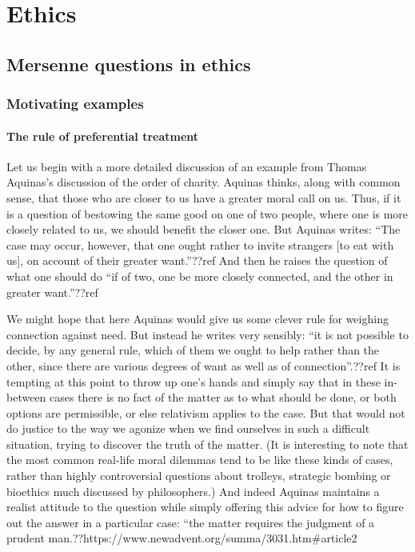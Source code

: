 \def\mychapter{II}

\chapter{Ethics}\label{ch:ethics}
\section{Mersenne questions in ethics}
\subsection{Motivating examples}
\subsubsection{The rule of preferential treatment}
Let us begin with a more detailed discussion of an example from Thomas Aquinas's discussion of the order of charity. Aquinas thinks,
along with common sense, that those who are closer to us have a greater moral call on us.
Thus, if it is a question of bestowing the same good on one of two people, where one is more closely
related to us, we should benefit the closer one. But Aquinas writes: ``The case may occur, however, that one 
ought rather to invite strangers [to eat with us], on 
account of their greater want.''??ref And then he raises the question of what one should do ``if of two, one be 
more closely connected, and the other in greater want.''??ref

We might hope that here Aquinas would give us some clever rule for weighing connection against need. But 
instead he writes very sensibly: ``it is not possible to decide, by any general rule, which of them we ought 
to help rather than the other, since there are various degrees of want as well as of connection''.??ref It is
tempting at this point to throw up one's hands and simply say that in these in-between cases there is no
fact of the matter as to what should be done, or both options are permissible, or else relativism applies
to the case. But that would not do justice to the way we agonize when we find ourselves in such a difficult 
situation, trying to discover the truth of the matter. (It is interesting to note that the most common real-life moral dilemmas
tend to be like these kinds of cases, rather than highly controversial questions about trolleys, strategic bombing or
bioethics much discussed by philosophers.)
And indeed Aquinas maintains a realist attitude to
the question while simply offering this advice for how to figure out the answer in a particular case: ``the matter 
requires the judgment of a prudent man.??https://www.newadvent.org/summa/3031.htm\#article2

